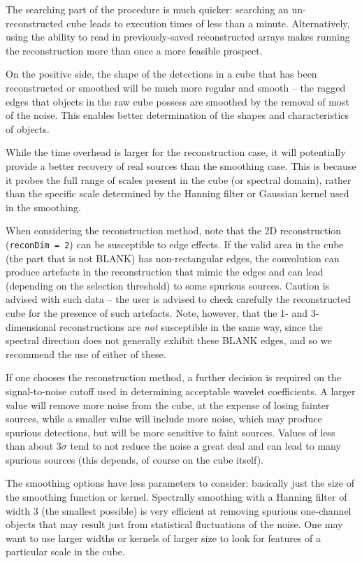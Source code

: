 The searching part of the procedure is much quicker: searching an
un-reconstructed cube leads to execution times of less than a
minute. Alternatively, using the ability to read in previously-saved
reconstructed arrays makes running the reconstruction more than once a
more feasible prospect.

On the positive side, the shape of the detections in a cube that has
been reconstructed or smoothed will be much more regular and smooth --
the ragged edges that objects in the raw cube possess are smoothed by
the removal of most of the noise. This enables better determination of
the shapes and characteristics of objects.

While the time overhead is larger for the reconstruction case, it will
potentially provide a better recovery of real sources than the
smoothing case. This is because it probes the full range of scales
present in the cube (or spectral domain), rather than the specific
scale determined by the Hanning filter or Gaussian kernel used in the
smoothing. 

When considering the reconstruction method, note that the 2D
reconstruction (\texttt{reconDim = 2}) can be susceptible to edge
effects. If the valid area in the cube (\ie the part that is not
BLANK) has non-rectangular edges, the convolution can produce
artefacts in the reconstruction that mimic the edges and can lead
(depending on the selection threshold) to some spurious
sources. Caution is advised with such data -- the user is advised to
check carefully the reconstructed cube for the presence of such
artefacts. Note, however, that the 1- and 3-dimensional
reconstructions are \emph{not} susceptible in the same way, since the
spectral direction does not generally exhibit these BLANK edges, and
so we recommend the use of either of these.

If one chooses the reconstruction method, a further decision is
required on the signal-to-noise cutoff used in determining acceptable
wavelet coefficients. A larger value will remove more noise from the
cube, at the expense of losing fainter sources, while a smaller value
will include more noise, which may produce spurious detections, but
will be more sensitive to faint sources. Values of less than about
$3\sigma$ tend to not reduce the noise a great deal and can lead to
many spurious sources (this depends, of course on the cube itself).

The smoothing options have less parameters to consider: basically just
the size of the smoothing function or kernel. Spectrally smoothing
with a Hanning filter of width 3 (the smallest possible) is very
efficient at removing spurious one-channel objects that may result
just from statistical fluctuations of the noise. One may want to use
larger widths or kernels of larger size to look for features of a
particular scale in the cube.

